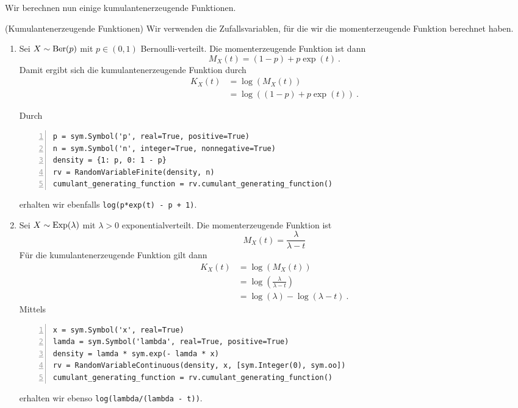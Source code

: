 Wir berechnen nun einige kumulantenerzeugende Funktionen.

\begin{Beispiel}{(Kumulantenerzeugende Funktionen)}
Wir verwenden die Zufallsvariablen, für die wir \hyperlink{Bsp:Moment_Erz}{} die momenterzeugende Funktion berechnet haben.
\begin{enumerate}[label=(\roman*)]
\item Sei $X \sim \operatorname{Ber}(p)$ mit $p \in (0, 1)$ Bernoulli-verteilt. Die momenterzeugende Funktion ist dann
\[M_X(t) = (1 - p) + p \exp(t)~.\]
Damit ergibt sich die kumulantenerzeugende Funktion durch
\begin{align*}
K_X(t) &= \log(M_X(t))\\
&= \log\left( (1 - p) + p \exp(t) \right)~.
\end{align*}

\newpage

Durch
\begin{lstlisting}[numbers=left, numberstyle=\tiny\color{codegray}]
p = sym.Symbol('p', real=True, positive=True)
n = sym.Symbol('n', integer=True, nonnegative=True)
density = {1: p, 0: 1 - p}
rv = RandomVariableFinite(density, n)
cumulant_generating_function = rv.cumulant_generating_function()
\end{lstlisting}
erhalten wir ebenfalls \lstinline|log(p*exp(t) - p + 1)|.

\item Sei $X \sim \operatorname{Exp}(\lambda)$ mit $\lambda > 0$ exponentialverteilt. Die momenterzeugende Funktion ist
\[M_X(t) = \frac{\lambda}{\lambda - t}\]
Für die kumulantenerzeugende Funktion gilt dann
\begin{align*}
K_X(t) &= \log(M_X(t))\\
&= \log\left( \frac{\lambda}{\lambda - t} \right)\\
&= \log(\lambda) - \log(\lambda - t)~.
\end{align*}
Mittels
\begin{lstlisting}[numbers=left, numberstyle=\tiny\color{codegray}]
x = sym.Symbol('x', real=True)
lamda = sym.Symbol('lambda', real=True, positive=True)
density = lamda * sym.exp(- lamda * x)
rv = RandomVariableContinuous(density, x, [sym.Integer(0), sym.oo])
cumulant_generating_function = rv.cumulant_generating_function()
\end{lstlisting}
erhalten wir ebenso \lstinline|log(lambda/(lambda - t))|.


\end{enumerate}
\end{Beispiel}
